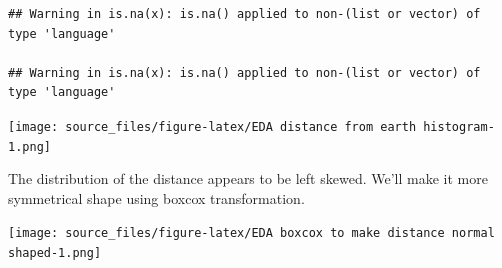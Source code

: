 \documentclass[
]{article}
\newenvironment{Shaded}{\begin{snugshade}}{\end{snugshade}}
\newcommand{\AttributeTok}[1]{\textcolor[rgb]{0.13,0.29,0.53}{#1}}
\newcommand{\DecValTok}[1]{\textcolor[rgb]{0.00,0.00,0.81}{#1}}
\newcommand{\FloatTok}[1]{\textcolor[rgb]{0.00,0.00,0.81}{#1}}
\newcommand{\FunctionTok}[1]{\textcolor[rgb]{0.13,0.29,0.53}{\textbf{#1}}}
\newcommand{\NormalTok}[1]{#1}
\newcommand{\OtherTok}[1]{\textcolor[rgb]{0.56,0.35,0.01}{#1}}
\newcommand{\SpecialCharTok}[1]{\textcolor[rgb]{0.81,0.36,0.00}{\textbf{#1}}}
\newcommand{\StringTok}[1]{\textcolor[rgb]{0.31,0.60,0.02}{#1}}
\begin{document}
\begin{Shaded}
\end{Shaded}

\begin{verbatim}
## Warning in is.na(x): is.na() applied to non-(list or vector) of type 'language'

## Warning in is.na(x): is.na() applied to non-(list or vector) of type 'language'
\end{verbatim}

\texttt{[image: source\_files/figure-latex/EDA distance from earth histogram-1.png]}

The distribution of the distance appears to be left skewed. We'll make
it more symmetrical shape using boxcox transformation.

\begin{Shaded}
\end{Shaded}

\texttt{[image: source\_files/figure-latex/EDA boxcox to make distance normal shaped-1.png]}
\end{document}
